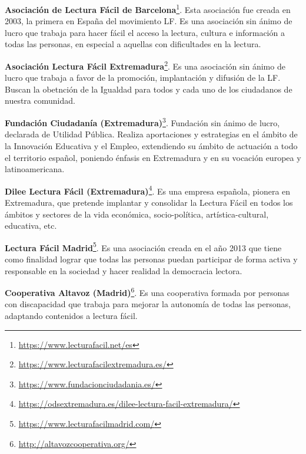 \begin{itemize}
	\item{\textbf{Asociación de Lectura Fácil de Barcelona}\footnote{\href{https://www.lecturafacil.net/es}{{https://www.lecturafacil.net/es}}}. Esta asociación fue creada en 2003, la primera en España del movimiento LF. Es una asociación sin ánimo de lucro que trabaja para hacer fácil el acceso la lectura, cultura e información a todas las personas, en especial a aquellas con dificultades en la lectura. 
	
	\item{\textbf{Asociación Lectura Fácil Extremadura}\footnote{\href{https://www.lecturafacilextremadura.es/}{{https://www.lecturafacilextremadura.es/}}}. Es una asociación sin ánimo de lucro que trabaja a favor de la promoción, implantación y difusión de la LF. Buscan la obetnción de la Igualdad para todos y cada uno de los ciudadanos de nuestra comunidad.
	
	\item{\textbf{Fundación Ciudadanía (Extremadura)}\footnote{\href{https://www.fundacionciudadania.es/}{https://www.fundacionciudadania.es/}}}. Fundación sin ánimo de lucro, declarada de Utilidad Pública. Realiza aportaciones y estrategias en el ámbito de la Innovación Educativa y el Empleo, extendiendo su ámbito de actuación a todo el territorio español, poniendo énfasis en Extremadura y en su vocación europea y latinoamericana.
	
	\item{\textbf{Dilee Lectura Fácil (Extremadura)}\footnote{\href{https://odsextremadura.es/dilee-lectura-facil-extremadura/}{https://odsextremadura.es/dilee-lectura-facil-extremadura/}}}. Es una empresa española, pionera en Extremadura, que pretende implantar y consolidar la Lectura Fácil en todos los ámbitos y sectores de la vida económica, socio-política, artística-cultural, educativa, etc.
	
	\item{\textbf{Lectura Fácil Madrid}\footnote{\href{https://www.lecturafacilmadrid.com/}{https://www.lecturafacilmadrid.com/}}}. Es una asociación creada en el año 2013 que tiene como finalidad  lograr que todas las personas puedan participar de forma activa y responsable en la sociedad y hacer realidad la democracia lectora. 
	
	\item{\textbf{Cooperativa Altavoz (Madrid)}\footnote{\href{http://altavozcooperativa.org/}{http://altavozcooperativa.org/}}}. Es una cooperativa formada por personas con discapacidad
	que trabaja para mejorar la autonomía de todas las personas, adaptando contenidos a lectura fácil.
	
}}
\end{itemize}
